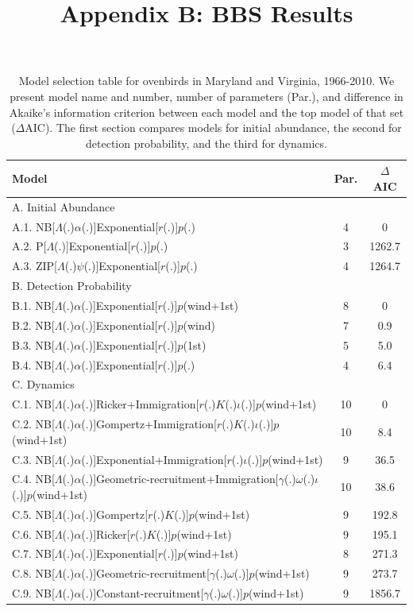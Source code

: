 \documentclass{article}
\begin{document}
\title{Appendix B: BBS Results}
\date{} %
\maketitle
\renewcommand*\thetable{B\arabic{table}}
\renewcommand*\thefigure{B\arabic{figure}}
\begin{table}[htb]
  \centering
  \small
\caption{Model selection table for ovenbirds in Maryland and Virginia,
    1966-2010.  We present model name and number, number of 
parameters (Par.), and difference in Akaike's
information criterion between each model and the top model of
that set ($\Delta$AIC).  The first section compares
models for initial abundance, the second for detection
probability, and the third for dynamics.}
  \begin{tabular}[h]{lcc}
\hline
Model	&Par.	&$\Delta$AIC	\\
\hline
A. Initial Abundance && \\
A.1. NB[$\Lambda$(.)$\alpha$(.)]Exponential[$r$(.)]$p$(.)	&4	&0\\
A.2. P[$\Lambda$(.)]Exponential[$r$(.)]$p$(.)	&3	&1262.7\\
A.3. ZIP[$\Lambda$(.)$\psi$(.)]Exponential[$r$(.)]$p$(.)	&4 &1264.7\\
\hline
B. Detection Probability && \\
B.1. NB[$\Lambda$(.)$\alpha$(.)]Exponential[$r$(.)]$p$(wind+1st)	&8 &0	\\
B.2. NB[$\Lambda$(.)$\alpha$(.)]Exponential[$r$(.)]$p$(wind) &7 &0.9\\
B.3. NB[$\Lambda$(.)$\alpha$(.)]Exponential[$r$(.)]$p$(1st)	&5	&5.0
\\B.4. NB[$\Lambda$(.)$\alpha$(.)]Exponential[$r$(.)]$p$(.)	&4	&6.4\\
\hline
C. Dynamics && \\
C.1. NB[$\Lambda$(.)$\alpha$(.)]Ricker+Immigration[$r$(.)$K$(.)$\iota$(.)]$p$(wind+1st) &10	&0	\\
C.2. NB[$\Lambda$(.)$\alpha$(.)]Gompertz+Immigration[$r$(.)$K$(.)$\iota$(.)]$p$(wind+1st) &10	&8.4 \\
C.3. NB[$\Lambda$(.)$\alpha$(.)]Exponential+Immigration[$r$(.)$\iota$(.)]$p$(wind+1st) &9	&36.5\\
C.4. NB[$\Lambda$(.)$\alpha$(.)]Geometric-recruitment+Immigration[$\gamma$(.)$\omega$(.)$\iota$(.)]$p$(wind+1st) &10	&38.6\\
C.5. NB[$\Lambda$(.)$\alpha$(.)]Gompertz[$r$(.)$K$(.)]$p$(wind+1st) &9	&192.8\\
C.6. NB[$\Lambda$(.)$\alpha$(.)]Ricker[$r$(.)$K$(.)]$p$(wind+1st) &9	&195.1\\
C.7. NB[$\Lambda$(.)$\alpha$(.)]Exponential[$r$(.)]$p$(wind+1st)	&8 &271.3\\
C.8. NB[$\Lambda$(.)$\alpha$(.)]Geometric-recruitment[$\gamma$(.)$\omega$(.)]$p$(wind+1st) &9	&273.7\\
C.9. NB[$\Lambda$(.)$\alpha$(.)]Constant-recruitment[$\gamma$(.)$\omega$(.)]$p$(wind+1st) &9	&1856.7\\
\hline
\end{tabular}
\end{table}
\clearpage
\end{document}
